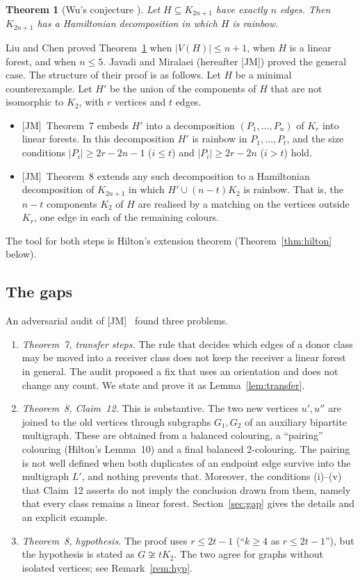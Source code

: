 \documentclass[11pt]{amsart}
\newtheorem{theorem}{Theorem}[section]
\theoremstyle{definition}
\theoremstyle{remark}
\newcommand{\JM}{\textup{[JM]}}
\begin{document}
\begin{theorem}[Wu's conjecture {\cite[Conj.~1]{JM}}]\label{thm:wu}
Let $H\subseteq K_{2n+1}$ have exactly $n$ edges. Then $K_{2n+1}$ has a Hamiltonian
decomposition in which $H$ is rainbow.
\end{theorem}

Liu and Chen \cite{LC} proved Theorem~\ref{thm:wu} when $|V(H)|\le n+1$, when $H$ is a linear
forest, and when $n\le5$. Javadi and Miralaei \cite{JM} (hereafter \JM) proved the general case.
The structure of their proof is as follows. Let $H$ be a minimal counterexample. Let $H'$ be the
union of the components of $H$ that are not isomorphic to $K_2$, with $r$ vertices and $t$ edges.
\begin{itemize}[leftmargin=*]
\item \JM\ Theorem~7 embeds $H'$ into a decomposition $(P_1,\dots,P_n)$ of $K_r$ into linear
forests. In this decomposition $H'$ is rainbow in $P_1,\dots,P_t$, and the size conditions
$|P_i|\ge 2r-2n-1$ ($i\le t$) and $|P_i|\ge 2r-2n$ ($i>t$) hold.
\item \JM\ Theorem~8 extends any such decomposition to a Hamiltonian decomposition of
$K_{2n+1}$ in which $H'\cup(n-t)K_2$ is rainbow. That is, the $n-t$ components $K_2$ of $H$ are
realised by a matching on the vertices outside $K_r$, one edge in each of the remaining colours.
\end{itemize}
The tool for both steps is Hilton's extension theorem \cite{Hilton} (Theorem~\ref{thm:hilton}
below).

\subsection*{The gaps}
An adversarial audit of \JM\ \cite[\S2]{A4} found three problems.
\begin{enumerate}[label=\textup{(JM\arabic*)},leftmargin=*]
\item \emph{Theorem~7, transfer steps.} The rule that decides which edges of a donor class
may be moved into a receiver class does not keep the receiver a linear forest in general. The
audit proposed a fix that uses an orientation and does not change any count. We state and
prove it as Lemma~\ref{lem:transfer}.
\item \emph{Theorem~8, Claim~12.} This is substantive. The two new vertices $u',u''$ are joined
to the old vertices through subgraphs $G_1,G_2$ of an auxiliary bipartite multigraph. These are
obtained from a balanced colouring, a ``pairing'' colouring (Hilton's Lemma~10) and a final
balanced 2-colouring. The pairing is not well defined when both duplicates of an endpoint
edge survive into the multigraph $L'$, and nothing prevents that. Moreover, the conditions
(i)--(v) that Claim~12 asserts do not imply the conclusion drawn from them, namely that every
class remains a linear forest. Section~\ref{sec:gap} gives the details and an explicit example.
\item \emph{Theorem~8, hypothesis.} The proof uses $r\le 2t-1$ (``$k\ge4$ as $r\le 2t-1$''),
but the hypothesis is stated as $G\not\cong tK_2$. The two agree for graphs without isolated
vertices; see Remark~\ref{rem:hyp}.
\end{enumerate}
\end{document}
